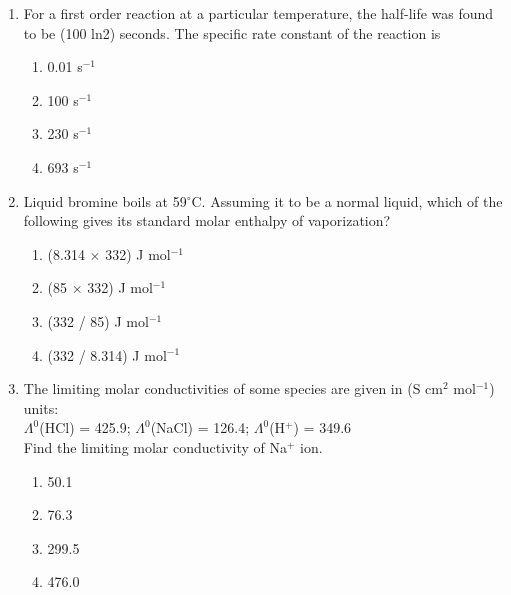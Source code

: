 \documentclass[journal,12pt,onecolumn]{IEEEtran}
\begin{document}
\begin{enumerate}
    \item For a first order reaction at a particular temperature, the half-life was found to be (100 ln2) seconds. The specific rate constant of the reaction is  
    \begin{multicols}{4}
    \begin{enumerate}[label=(\Alph*)]
        \item 0.01 s$^{-1}$
        \item 100 s$^{-1}$
        \item 230 s$^{-1}$
        \item 693 s$^{-1}$
    \end{enumerate}
    \end{multicols}

    \item Liquid bromine boils at 59$^\circ$C. Assuming it to be a normal liquid, which of the following gives its standard molar enthalpy of vaporization?  
    \begin{multicols}{4}
    \begin{enumerate}[label=(\Alph*)]
        \item (8.314 $\times$ 332) J mol$^{-1}$
        \item (85 $\times$ 332) J mol$^{-1}$
        \item (332 / 85) J mol$^{-1}$
        \item (332 / 8.314) J mol$^{-1}$
    \end{enumerate}
    \end{multicols}

    \item The limiting molar conductivities of some species are given in (S cm$^2$ mol$^{-1}$) units: \\
    $\Lambda^0$(HCl) = 425.9; $\Lambda^0$(NaCl) = 126.4; $\Lambda^0$(H$^+$) = 349.6 \\
    Find the limiting molar conductivity of Na$^+$ ion.  
    \begin{multicols}{4}
    \begin{enumerate}[label=(\Alph*)]
        \item 50.1
        \item 76.3
        \item 299.5
        \item 476.0
    \end{enumerate}
    \end{multicols}


\end{enumerate}
\end{document}
